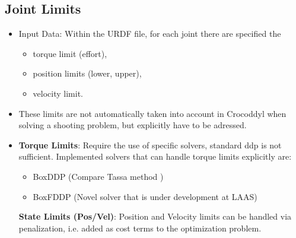 \subsection{Joint Limits}
\begin{itemize}
\item Input Data: Within the URDF file, for each joint there are specified the
\begin{itemize}
	\item torque limit (effort),
	\item position limits (lower, upper),
	\item velocity limit.
\end{itemize}
\item These limits are not automatically taken into account in Crocoddyl when solving a shooting problem, but explicitly have to be adressed.
\item \textbf{Torque Limits}: Require the use of specific solvers, standard ddp is not sufficient. Implemented solvers that can handle torque limits explicitly are: 
\begin{itemize}
\item BoxDDP (Compare Tassa method \cite{tassa2014control})
\item BoxFDDP (Novel solver that is under development at LAAS)
\end{itemize}
\textbf{State Limits (Pos/Vel)}: Position and Velocity limits can be handled via penalization, i.e. added as cost terms to the optimization problem.  
\end{itemize}

